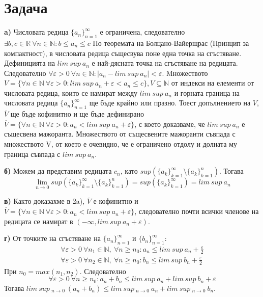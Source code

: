 \documentclass{article}
\newcommand*{\bR}{\mathbb{R}}
\begin{document}
\section[2]{Задача}
\textbf{a)}  Числовата редица $\{a_n\}^\infty_{n=1}$ е ограничена, следователно $\exists b,c \in \bR \ \forall n \in \mathbb{N}:b\leq a_n \leq c$
По теоремата на Болцано-Вайерщрас (Принцип за компактност), в числовата редица същесвува поне една точка на сгъстяване.
Дефиницията на $lim \ sup \ a_n$ е най-дясната точка на сгъстяване на редицата. Следователно $\forall \varepsilon>0 \ \forall n \in \mathbb{N} : |a_n - lim \ sup \ a_n| < \varepsilon$.
Mножеството $V=\{\forall n\in \mathbb{N} \  \forall \varepsilon > 0: lim \ sup \ a_n + \varepsilon < a_n \leq c\}, V \subseteq\mathbb{N}$
от индекси на елементи от числовата редица, които се намират между $lim \ sup \ a_n$ и горната граница на числовата редица $\{a_n\}^\infty_{n=1}$
ще бъде крайно или празно. Тоест допълнението на $V$, $\overline{V}$ ще бъде кофинитно и ще бъде дефинирано
$\overline{V} = \{\forall n \in \mathbb{N} \ \forall \varepsilon > 0: a_n < lim  \ sup \ a_n +\varepsilon\}$,
с което доказваме, че $lim \ sup \ a_n$ е същесвена мажоранта. Множеството от същесвените мажоранти съвпада с множеството V,
от което е очевидно, че е ограничено отдолу и долната му граница съвпада с $lim \ sup \ a_n$.

\textbf{б)}
Можем да представим редицата $c_n$, като $sup(\{a_k\}^\infty_{k=1}\setminus\{a_k\}^n_{k=1})$. Тогава
\[
    \lim_{n\rightarrow 0} sup(\{a_k\}^\infty_{k=1}\setminus\{a_k\}^n_{k=1}) = sup(\{a_k\}^\infty_{k=1}) = lim \ sup \ a_n
\]

\textbf{в)} Както доказахме в 2a), $\overline{V}$ е кофинитно и $\overline{V} = \{\forall n \in \mathbb{N} \ \forall \varepsilon > 0: a_n < lim  \ sup \ a_n +\varepsilon\}$,
следователно почти всички членове на редицата се намират в $(-\infty, lim \ sup \ a_n + \varepsilon)$.

\textbf{г)}
От точките на сгъстяване на $\{a_n\}^\infty_{n=1}$ и $\{b_n\}^\infty_{n=1}$:
\begin{gather*}
    \forall\varepsilon > 0 \ \forall n_1 \in \mathbb{N}, \ \forall n\geq n_0: a_n \leq lim \ sup \ a_n + \frac{\varepsilon}{2}\\
    \forall\varepsilon > 0 \ \forall n_2 \in \mathbb{N}, \ \forall n\geq n_0: b_n \leq lim \ sup \ b_n + \frac{\varepsilon}{2}
\end{gather*}
При $n_0 = max(n_1,n_2)$. Следователно
\[
    \forall\varepsilon > 0 \ \forall n \geq n_0 : a_n + b_n \leq lim \ sup \ a_n + lim \ sup \ b_n + \varepsilon
\]
Тогава $lim \ sup \ _{n\rightarrow 0} \ (a_n + b_n) \leq lim \ sup \ _{n\rightarrow 0} \ a_n + lim \ sup \ _{n\rightarrow 0} \ b_n$.
\end{document}
